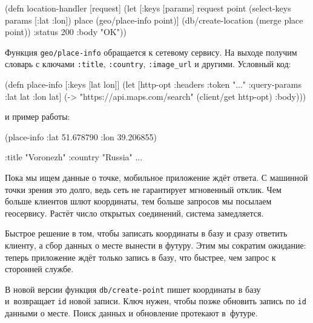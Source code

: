 \else

\begin{english}
  \begin{clojure}
(defn location-handler [request]
  (let [{:keys [params]} request
        point (select-keys params [:lat :lon])
        place (geo/place-info point)]
    (db/create-location (merge place point))
    {:status 200 :body "OK"}))
  \end{clojure}
\end{english}

\fi

Функция \verb|geo/place-info| обращается к сетевому сервису. На выходе получим
словарь с ключами \verb|:title|, \verb|:country|, \verb|:image_url| и
другими. Условный код:


\begin{english}
  \begin{clojure}
(defn place-info
  [{:keys [lat lon]}]
  (let [http-opt {:headers {:token "..."}
                  :query-params {:lat lat :lon lat}}]
    (-> "https://api.maps.com/search"
        (client/get http-opt)
        :body)))
  \end{clojure}
\end{english}

\noindent
и пример работы:

\begin{english}
  \begin{clojure}
(place-info {:lat 51.678790
             :lon 39.206855})

{:title "Voronezh"
 :country "Russia"
 ...}
  \end{clojure}
\end{english}

Пока мы ищем данные о точке, мобильное приложение ждёт ответа. С машинной точки
зрения это долго, ведь сеть не гарантирует мгновенный отклик. Чем больше
клиентов шлют координаты, тем больше запросов мы посылаем геосервису. Растёт
число открытых соединений, система замедляется.


Быстрое решение в том, чтобы записать координаты в базу и сразу ответить
клиенту, а сбор данных о месте вынести в футуру. Этим мы сократим ожидание:
теперь приложение ждёт только запись в базу, что быстрее, чем запрос к сторонней
службе.

В новой версии функция \verb|db/create-point| пишет координаты в базу
и~возвращает \verb|id| новой записи. Ключ нужен, чтобы позже обновить запись по
\verb|id| данными о месте. Поиск данных и обновление протекают в~футуре.

